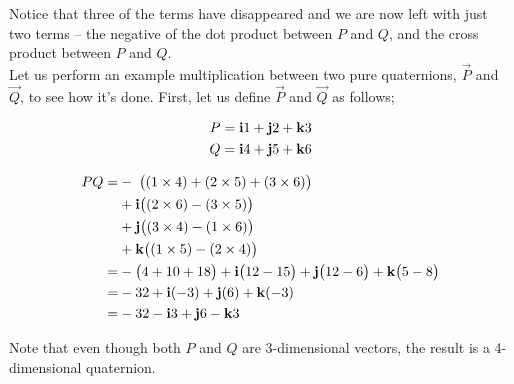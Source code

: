 Notice that three of the terms have disappeared and we are now left with just two terms -- the negative of the dot
product between \(P\) and \(Q\), and the cross product between \(P\) and \(Q\).  \\

Let us perform an example multiplication between two pure quaternions, \(\vec{P}\) and \(\vec{Q}\), to see how it's done.
First, let us define \(\vec{P}\) and \(\vec{Q}\) as follows;

\begin{align*}
    P & = \bm{\mathrm{i}} 1 + \bm{\mathrm{j}} 2 + \bm{\mathrm{k}} 3  \\
    Q & = \bm{\mathrm{i}} 4 + \bm{\mathrm{j}} 5 + \bm{\mathrm{k}} 6
\end{align*}


\begin{align*}
    PQ = & - \; \bigl((1 \times 4) + (2 \times 5) + (3 \times 6)\bigr) \\
         & + \bm{\mathrm{i}} \bigl((2 \times 6) - (3 \times 5)\bigr) \\
         & + \bm{\mathrm{j}} \bigl((3 \times 4) - (1 \times 6)\bigr) \\
         & + \bm{\mathrm{k}} \bigl((1 \times 5) - (2 \times 4)\bigr)  \\
    = & -\bigl(4 + 10 + 18\bigr) +
                   \bm{\mathrm{i}} \bigl(12 - 15\bigr) +
                   \bm{\mathrm{j}} \bigl(12 - 6\bigr) +
                   \bm{\mathrm{k}} \bigl(5  - 8\bigr)  \\
               = & -32 + \bm{\mathrm{i}} (-3) + \bm{\mathrm{j}} (6) + \bm{\mathrm{k}} (-3) \\
               = & -32 - \bm{\mathrm{i}} 3 + \bm{\mathrm{j}} 6 - \bm{\mathrm{k}} 3
\end{align*}

Note that even though both \(P\) and \(Q\) are 3-dimensional vectors, the result is a 4-dimensional quaternion.